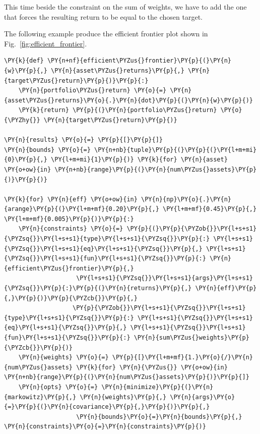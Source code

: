 This time beside the constraint on the sum of weights, we have to add the one that forces the resulting return to be equal to the chosen target.

The following example produce the efficient frontier plot shown in Fig.~\ref{fig:efficient_frontier}.

\begin{tcolorbox}[breakable, size=fbox, boxrule=1pt, pad at break*=1mm,colback=cellbackground, colframe=cellborder]
\begin{Verbatim}[commandchars=\\\{\}]
\PY{k}{def} \PY{n+nf}{efficient\PYZus{}frontier}\PY{p}{(}\PY{n}{w}\PY{p}{,} \PY{n}{asset\PYZus{}returns}\PY{p}{,} \PY{n}{target\PYZus{}return}\PY{p}{)}\PY{p}{:} 
    \PY{n}{portfolio\PYZus{}return} \PY{o}{=} \PY{n}{asset\PYZus{}returns}\PY{o}{.}\PY{n}{dot}\PY{p}{(}\PY{n}{w}\PY{p}{)} 
    \PY{k}{return} \PY{p}{(}\PY{n}{portfolio\PYZus{}return} \PY{o}{\PYZhy{}} \PY{n}{target\PYZus{}return}\PY{p}{)}
		
\PY{n}{results} \PY{o}{=} \PY{p}{[}\PY{p}{]}
\PY{n}{bounds} \PY{o}{=} \PY{n+nb}{tuple}\PY{p}{(}\PY{p}{(}\PY{l+m+mi}{0}\PY{p}{,} \PY{l+m+mi}{1}\PY{p}{)} \PY{k}{for} \PY{n}{asset} \PY{o+ow}{in} \PY{n+nb}{range}\PY{p}{(}\PY{n}{num\PYZus{}assets}\PY{p}{)}\PY{p}{)}
		
\PY{k}{for} \PY{n}{eff} \PY{o+ow}{in} \PY{n}{np}\PY{o}{.}\PY{n}{arange}\PY{p}{(}\PY{l+m+mf}{0.20}\PY{p}{,} \PY{l+m+mf}{0.45}\PY{p}{,} \PY{l+m+mf}{0.005}\PY{p}{)}\PY{p}{:}
    \PY{n}{constraints} \PY{o}{=} \PY{p}{(}\PY{p}{\PYZob{}}\PY{l+s+s1}{\PYZsq{}}\PY{l+s+s1}{type}\PY{l+s+s1}{\PYZsq{}}\PY{p}{:} \PY{l+s+s1}{\PYZsq{}}\PY{l+s+s1}{eq}\PY{l+s+s1}{\PYZsq{}}\PY{p}{,} \PY{l+s+s1}{\PYZsq{}}\PY{l+s+s1}{fun}\PY{l+s+s1}{\PYZsq{}}\PY{p}{:} \PY{n}{efficient\PYZus{}frontier}\PY{p}{,} 
                    \PY{l+s+s1}{\PYZsq{}}\PY{l+s+s1}{args}\PY{l+s+s1}{\PYZsq{}}\PY{p}{:}\PY{p}{(}\PY{n}{returns}\PY{p}{,} \PY{n}{eff}\PY{p}{,}\PY{p}{)}\PY{p}{\PYZcb{}}\PY{p}{,}
                   \PY{p}{\PYZob{}}\PY{l+s+s1}{\PYZsq{}}\PY{l+s+s1}{type}\PY{l+s+s1}{\PYZsq{}}\PY{p}{:} \PY{l+s+s1}{\PYZsq{}}\PY{l+s+s1}{eq}\PY{l+s+s1}{\PYZsq{}}\PY{p}{,} \PY{l+s+s1}{\PYZsq{}}\PY{l+s+s1}{fun}\PY{l+s+s1}{\PYZsq{}}\PY{p}{:} \PY{n}{sum\PYZus{}weights}\PY{p}{\PYZcb{}}\PY{p}{)}
    \PY{n}{weights} \PY{o}{=} \PY{p}{[}\PY{l+m+mf}{1.}\PY{o}{/}\PY{n}{num\PYZus{}assets} \PY{k}{for} \PY{n}{\PYZus{}} \PY{o+ow}{in} \PY{n+nb}{range}\PY{p}{(}\PY{n}{num\PYZus{}assets}\PY{p}{)}\PY{p}{]}
    \PY{n}{opts} \PY{o}{=} \PY{n}{minimize}\PY{p}{(}\PY{n}{markowitz}\PY{p}{,} \PY{n}{weights}\PY{p}{,} \PY{n}{args}\PY{o}{=}\PY{p}{(}\PY{n}{covariance}\PY{p}{,}\PY{p}{)}\PY{p}{,}
                    \PY{n}{bounds}\PY{o}{=}\PY{n}{bounds}\PY{p}{,} \PY{n}{constraints}\PY{o}{=}\PY{n}{constraints}\PY{p}{)} 
		

\end{Verbatim}
\end{tcolorbox}
